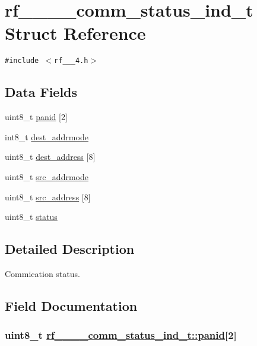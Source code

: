\hypertarget{structrf__802__15__4__comm__status__ind__t}{
\section{rf\_\_\_\_\-comm\_\-status\_\-ind\_\-t Struct Reference}
\label{structrf__802__15__4__comm__status__ind__t}
}
{\tt \#include $<$rf\_\_\_\-4.h$>$}

\subsection*{Data Fields}
\begin{CompactItemize}
\item 
uint8\_\-t \hyperlink{structrf__802__15__4__comm__status__ind__t_05f311f7f9aa903839bd9785d539b96c}{panid} \mbox{[}2\mbox{]}
\item 
int8\_\-t \hyperlink{structrf__802__15__4__comm__status__ind__t_71c54d414c1afbeb6074a8d0487cafde}{dest\_\-addrmode}
\item 
uint8\_\-t \hyperlink{structrf__802__15__4__comm__status__ind__t_0c1a4fe2334dbc01043e3837b7c60732}{dest\_\-address} \mbox{[}8\mbox{]}
\item 
uint8\_\-t \hyperlink{structrf__802__15__4__comm__status__ind__t_1deccf74af49075ccf27788bf7a41084}{src\_\-addrmode}
\item 
uint8\_\-t \hyperlink{structrf__802__15__4__comm__status__ind__t_3d8825053b35dbb8ee9ea4fbd2226423}{src\_\-address} \mbox{[}8\mbox{]}
\item 
uint8\_\-t \hyperlink{structrf__802__15__4__comm__status__ind__t_674eed88c71b40a8df8b93af54cb8ad0}{status}
\end{CompactItemize}


\subsection{Detailed Description}
Commication status. 



\subsection{Field Documentation}
\hypertarget{structrf__802__15__4__comm__status__ind__t_05f311f7f9aa903839bd9785d539b96c}{
\subsubsection[panid]{\setlength{\rightskip}{0pt plus 5cm}uint8\_\-t \hyperlink{structrf__802__15__4__comm__status__ind__t_05f311f7f9aa903839bd9785d539b96c}{rf\_\_\_\_\-comm\_\-status\_\-ind\_\-t::panid}\mbox{[}2\mbox{]}}}
\label{structrf__802__15__4__comm__status__ind__t_05f311f7f9aa903839bd9785d539b96c}


